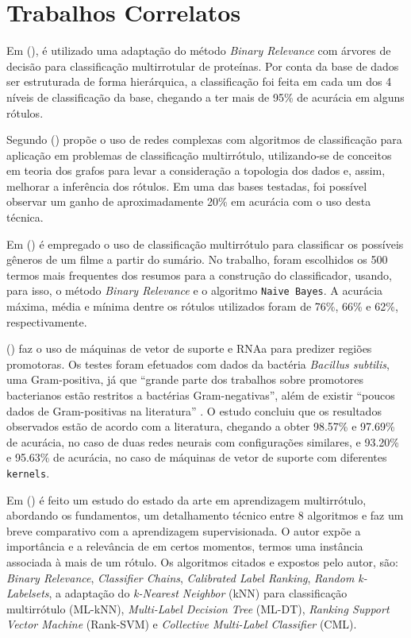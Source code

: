 \section{Trabalhos Correlatos}

Em  (\citeyear{tanaka2013adaptaccao}), é utilizado uma adaptação do método \textit{Binary Relevance} com árvores de decisão para classificação multirrotular de proteínas. Por conta da base de dados ser estruturada de forma hierárquica, a classificação foi feita em cada um dos 4 níveis de classificação da base, chegando a ter mais de 95\% de acurácia em alguns rótulos.

Segundo  (\citeyear{resende2018combinaccao}) propõe o uso de redes complexas com algoritmos de classificação para aplicação em problemas de classificação multirrótulo, utilizando-se de conceitos em teoria dos grafos para levar a consideração a topologia dos dados e, assim, melhorar a inferência dos rótulos. Em uma das bases testadas, foi possível observar um ganho de aproximadamente 20\% em acurácia com o uso desta técnica.

Em  (\citeyear{ururahy2018classificaccao}) é empregado o uso de classificação multirrótulo para classificar os possíveis gêneros de um filme a partir do sumário. No trabalho, foram escolhidos os 500 termos mais frequentes dos resumos para a construção do classificador, usando, para isso, o método \textit{Binary Relevance} e o algoritmo \texttt{Naive Bayes}. A acurácia máxima, média e mínima dentre os rótulos utilizados foram de 76\%, 66\% e 62\%, respectivamente. 

 (\citeyear{coelho2018prediccao}) faz o uso de máquinas de vetor de suporte e RNAa para predizer regiões promotoras. Os testes foram efetuados com dados da bactéria \textit{Bacillus subtilis}, uma Gram-positiva, já que “grande parte dos trabalhos sobre promotores bacterianos estão restritos a bactérias Gram-negativas”, além de existir “poucos dados de Gram-positivas na literatura” \cite{coelho2018prediccao}. O estudo concluiu que os resultados observados estão de acordo com a literatura, chegando a obter 98.57\% e 97.69\% de acurácia, no caso de duas redes neurais com configurações similares, e 93.20\% e 95.63\% de acurácia, no caso de máquinas de vetor de suporte com diferentes \texttt{kernels}.

 Em  (\citeyear{zhang2014review}) é feito um estudo do estado da arte em aprendizagem multirrótulo, abordando os fundamentos, um detalhamento técnico entre 8 algoritmos e faz um breve comparativo com a aprendizagem supervisionada. O autor expõe a importância e a relevância de em certos momentos, termos uma instância associada à mais de um rótulo. Os algoritmos citados e expostos pelo autor, são: \textit{Binary Relevance}, \textit{Classifier Chains}, \textit{Calibrated Label Ranking}, \textit{Random k-Labelsets}, a adaptação do \textit{k-Nearest Neighbor} (kNN) para classificação multirrótulo (ML-kNN), \textit{Multi-Label Decision Tree} (ML-DT), \textit{Ranking Support Vector Machine} (Rank-SVM) e \textit{Collective Multi-Label Classifier} (CML).

